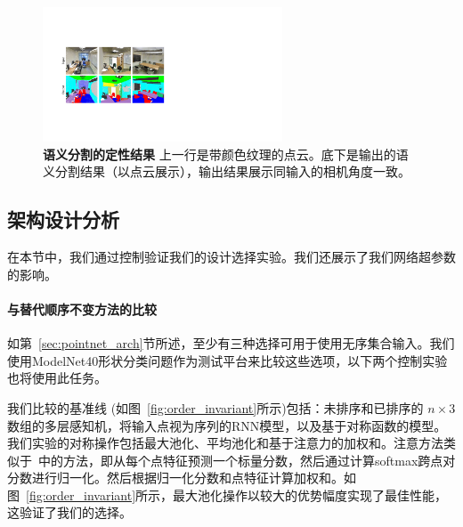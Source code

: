 \begin{figure}[t!]
    \centering
    \includegraphics[width=0.8\linewidth,height=4cm]{fig/semantic}
    \caption{\textbf{语义分割的定性结果} 上一行是带颜色纹理的点云。底下是输出的语义分割结果（以点云展示），输出结果展示同输入的相机角度一致。}
    \label{fig:qualitative_segmentation}
\end{figure}

\subsection{架构设计分析}
\label{sec:arch_analysis}

在本节中，我们通过控制验证我们的设计选择实验。我们还展示了我们网络超参数的影响。


\paragraph{与替代顺序不变方法的比较} 如第~\ref{sec:pointnet_arch}节所述，至少有三种选择可用于使用无序集合输入。我们使用ModelNet40形状分类问题作为测试平台来比较这些选项，以下两个控制实验也将使用此任务。

我们比较的基准线 (如图~\ref{fig:order_invariant}所示)包括：未排序和已排序的 $n \times 3$ 数组的多层感知机，将输入点视为序列的RNN模型，以及基于对称函数的模型。我们实验的对称操作包括最大池化、平均池化和基于注意力的加权和。注意方法类似于~\cite{vinyals2015order}中的方法，即从每个点特征预测一个标量分数，然后通过计算softmax跨点对分数进行归一化。然后根据归一化分数和点特征计算加权和。如图~\ref{fig:order_invariant}所示，最大池化操作以较大的优势幅度实现了最佳性能，这验证了我们的选择。


